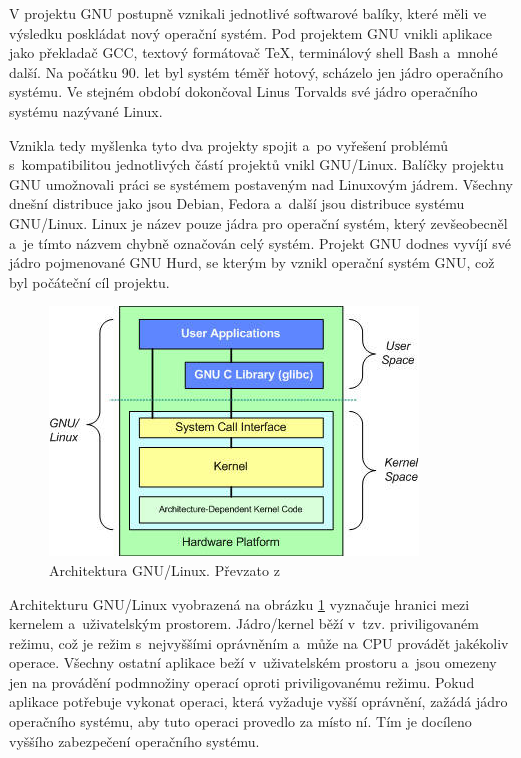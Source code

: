 V projektu GNU postupně vznikali jednotlivé softwarové balíky, které měli ve výsledku poskládat nový operační systém. Pod projektem GNU vnikli aplikace jako překladač GCC,
textový formátovač TeX, terminálový shell Bash a mnohé další. Na počátku 90. let byl systém téměř hotový, scházelo jen jádro operačního systému. Ve stejném období dokončoval
Linus Torvalds své jádro operačního systému nazývané Linux. \cite{GNULinux} \cite{GNULinux2} 

Vznikla tedy myšlenka tyto dva projekty spojit a po vyřešení problémů s kompatibilitou jednotlivých částí projektů vnikl GNU/Linux. Balíčky projektu GNU umožnovali práci
se systémem postaveným nad Linuxovým jádrem. Všechny dnešní distribuce jako jsou Debian, Fedora a další jsou distribuce systému GNU/Linux. Linux je název pouze jádra pro 
operační systém, který zevšeobecněl a je tímto názvem chybně označován celý systém. Projekt GNU dodnes vyvíjí své jádro pojmenované GNU Hurd, se kterým by vznikl operační
systém GNU, což byl počáteční cíl projektu. \cite{GNULinux2}

\begin{figure}[h]
    \centering
    \includegraphics[width=0.6\linewidth]{other-fig/userspace.jpg}
    \caption{Architektura GNU/Linux. Převzato z \cite{Userspace}}
    \label{fig:gnu_linux_architecture}
\end{figure}

Architekturu GNU/Linux vyobrazená na obrázku \ref{fig:gnu_linux_architecture} vyznačuje hranici mezi kernelem a uživatelským prostorem. Jádro/kernel běží v tzv. priviligovaném
režimu, což je režim s nejvyššími oprávněním a může na CPU provádět jakékoliv operace. Všechny ostatní aplikace beží v uživatelském prostoru a jsou omezeny jen na provádění 
podmnožiny operací oproti priviligovanému režimu. Pokud aplikace potřebuje vykonat operaci, která vyžaduje vyšší oprávnění, zažádá jádro operačního systému, aby tuto operaci 
provedlo za místo ní. Tím je docíleno vyššího zabezpečení operačního systému.

